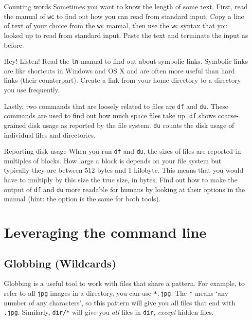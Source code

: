 \documentclass{TheAlternativeCourse}
\begin{document}
\begin{exercisebox}{Counting words}
	Sometimes you want to know the length of some text. First, read the manual of \texttt{wc} to find out how you can read from standard input. Copy a line of text of your choice from the \texttt{wc} manual, then use the \texttt{wc} syntax that you looked up to read from standard input. Paste the text and terminate the input as before.
\end{exercisebox}


\begin{exercisebox}{Hey! Listen!}
	Read the \texttt{ln} manual to find out about symbolic links. Symbolic links are like shortcuts in Windows and OS X and are often more useful than hard links (their counterpart). Create a link from your home directory to a directory you use frequently.
\end{exercisebox}

Lastly, two commands that are loosely related to files are \texttt{df} and \texttt{du}. These commands are used to find out how much space files take up. \texttt{df} shows coarse-grained disk usage as reported by the file system. \texttt{du} counts the disk usage of individual files and directories.

\begin{exercisebox}{Reporting disk usage}
	When you run \texttt{df} and \texttt{du}, the sizes of files are reported in multiples of blocks. How large a block is depends on your file system but typically they are between 512 bytes and 1 kilobyte. This means that you would have to multiply by this size the true size, in bytes. Find out how to make the output of \texttt{df} and \texttt{du} more readable for humans by looking at their options in the manual (hint: the option is the same for both tools).
\end{exercisebox}

\section{Leveraging the command line}

\subsection{Globbing (Wildcards)}

Globbing is a useful tool to work with files that share a pattern. For example,
to refer to all \texttt{jpg} images in a directory, you can use \texttt{*.jpg}.
The \texttt{*} means `any number of any characters', so this pattern will give
you all files that end with \texttt{.jpg}. Similarly, \texttt{dir/*} will give
you \emph{all} files in \texttt{dir}, \emph{except} hidden files.
\end{document}
